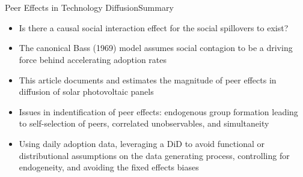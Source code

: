 \documentclass{beamer}
\begin{document}
\section{\cite{igami2015}}
\begin{frame}{Peer Effects in Technology Diffusion}{Summary}
\begin{itemize}
\item{Is there a causal social interaction effect for the social spillovers to exist?}
\item{The canonical Bass (1969) model assumes social contagion to be a driving force behind accelerating adoption rates}
\item{This article documents and estimates the magnitude of peer effects in diffusion of solar photovoltaic panels}
\item{Issues in indentification of peer effects: endogenous group formation leading to self-selection of peers, correlated unobservables, and simultaneity}
\item{Using daily adoption data, leveraging a DiD to avoid functional or distributional assumptions on the data generating process, controlling for endogeneity, and avoiding the fixed effects biases}
\end{itemize}
\end{frame}



\end{document}
